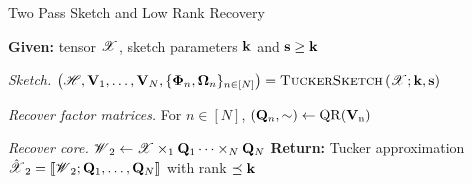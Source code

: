 \begin{algorithm}[H]
  \caption{Two Pass Sketch and Low Rank Recovery \label{alg:two_pass_low_rank_appro}}
  \textbf{Given:} tensor $\T{X}$, sketch parameters
  $\mathbf{k}$ and $\mathbf{s} \geq \mathbf{k}$
  \ben
  \item \emph{Sketch.}
  $\left(\T{H}, \mathbf{V}_1, \ldots, \mathbf{V}_N, \{\M{\Phi}_n, \M{\Omega}_n\}_{n \in [N]}\right) =
  \textproc{TuckerSketch}\left(\T{X}; \V{k}, \V{s}\right)$
  \item \emph{Recover factor matrices.} For $n \in [N]$,
  $
  (\mathbf{Q}_n, \sim) \leftarrow \rm{QR}(\mathbf{V}_n)
  $
  \item \emph{Recover core.}
  $
  \T{W}_2 \leftarrow \T{X} \times_1 \M{Q}_1 \cdots \times_N \M{Q}_N
  $
  \een
  \textbf{Return:} Tucker approximation
  $\hat{\T{X}}_2 = \llbracket\T{W}_2; \M{Q}_1, \ldots, \M{Q}_N \rrbracket$
  with rank $\preceq \mathbf{k}$
\end{algorithm}


